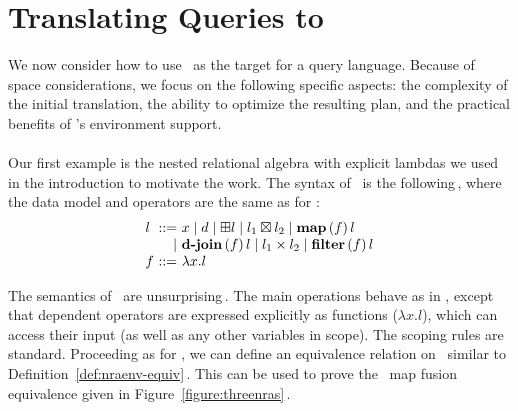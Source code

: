 \section{Translating Queries to \NRAEnv}
\label{sec:queries}

We now consider how to use \NRAEnv\ as the target for a query
language. Because of space considerations, we focus on the following
specific aspects: the complexity of the initial translation, the
ability to optimize the resulting plan, and the practical benefits of
\NRAEnv's environment support.

\paragraph*{\NRALambda}
\label{sec:queries:nralambda}

Our first example is the nested relational algebra with explicit
lambdas we used in the introduction to motivate the work.
%
The syntax of \NRALambda\ is the
following\,, where the data
model and operators are the same as for \NRAEnv:
$$
\begin{array}{l@{\ }r@{\ }l}
l & ::= &
  x %
  \mid d %
  \mid   \opunop l %
  \mid   l_1 \opbinop l_2 %
  \mid    \lmap{f}{l}\\   %
  &\mid&    \ldjoin{f}{l}   %
  \mid    l_1 \times l_2      %
  \mid  \lsel {f} {l}  %
\\
f & ::= & \lambda x. l
\end{array}
$$

The semantics of \NRALambda\ are
unsurprising\,.  The
main operations behave as in \NRAEnv, except that dependent operators
are expressed explicitly as functions ($\lambda x.l$), which can
access their input (as well as any other variables in scope).  The
scoping rules are standard. Proceeding as for \NRAEnv, we can define
an equivalence relation on \NRALambda\ similar to
Definition~\ref{def:nraenv-equiv}\,. This can be used to prove the
\NRALambda\ map fusion equivalence given in
Figure~\ref{figure:threenras}\,.

